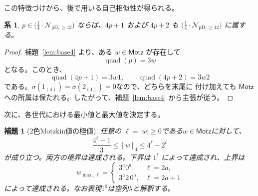 \documentclass[12pt]{ltjsarticle}
\theoremstyle{plain}
\newtheorem{lemma}[theorem]{補題}
\newtheorem{corollary}[theorem]{系}
\theoremstyle{definition}
\theoremstyle{plain}
\newcommand{\Pset}{%
  \bigl(\tfrac{1}{4}\cdot\mathcal{N}_{\mathrm{pD},\geq 12}\bigr)%
}
\begin{document}
この特徴づけから、後で用いる自己相似性が得られる。

\begin{corollary}\label{cor:Pclosure}
$p\in\Pset$ ならば、$4p+1$ および $4p+2$ も $\Pset$ に属する。
\end{corollary}

\begin{proof}
補題~\ref{lem:base4} より、ある $w\in\mathsf{Motz}$ が存在して
\[
 \operatorname{quad}(p)=3w
\]
となる。このとき、
\[
 \operatorname{quad}(4p+1)=3w1,
 \qquad
 \operatorname{quad}(4p+2)=3w2
\]
である。$\sigma(1_{(4)})=\sigma(2_{(4)})=0$なので、どちらを末尾に
付け加えても $\mathsf{Motz}$ への所属は保たれる。したがって、補題~\ref{lem:base4}
から主張が従う。
\end{proof}

次に、各世代における最小値と最大値を決定する。

\begin{lemma}[2色Motzkin値の極値]\label{lem:extremal}
任意の $\ell=|w|\geq0$である$w\in\mathsf{Motz}$に対して、
\begin{equation}\label{eq:motzkin-extrema}
  \frac{4^{\ell}-1}{3}\leq[w]_4\leq4^{\ell}-2^{\ell}
\end{equation}
が成り立つ。両方の境界は達成される。下界は $1^{\ell}$ によって達成され、上界は
\[
  w_{\max,\ell}=
  \begin{cases}
    3^a0^a,&\ell=2a,\\
    3^a2\,0^a,&\ell=2a+1
  \end{cases}
\]
によって達成される。なお表現$1^0$は空列$\lambda$と解釈する。
\end{lemma}
\end{document}
